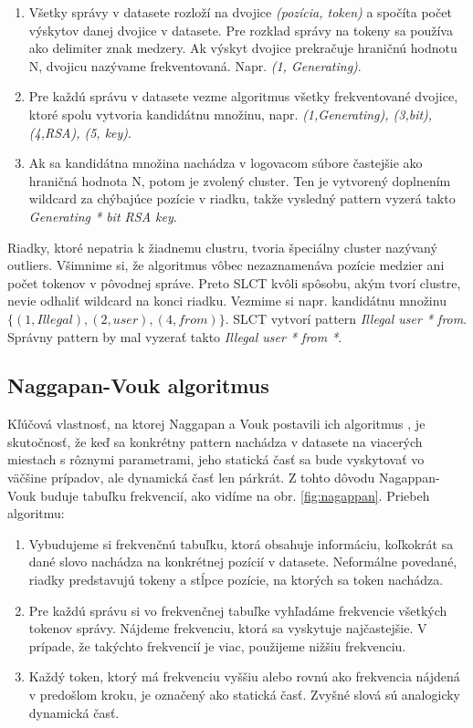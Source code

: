 \begin{enumerate}
  \item Všetky správy v datasete rozloží na dvojice \emph{(pozícia, token)} a spočíta počet výskytov danej dvojice v datasete. Pre rozklad správy na tokeny sa používa ako delimiter znak medzery. Ak výskyt dvojice prekračuje hraničnú hodnotu N, dvojicu nazývame frekventovaná. Napr. \emph{(1, Generating)}.
  \item Pre každú správu v datasete vezme algoritmus všetky frekventované dvojice, ktoré spolu vytvoria kandidátnu množinu, napr. \emph{{(1,Generating), (3,bit), (4,RSA), (5, key)}}. 
  \item Ak sa kandidátna množina nachádza v logovacom súbore častejšie ako hraničná hodnota N, potom je zvolený cluster. Ten je vytvorený doplnením wildcard za chýbajúce pozície v riadku, takže vysledný pattern vyzerá takto \emph{Generating * bit RSA key}.
\end{enumerate}

Riadky, ktoré nepatria k žiadnemu clustru, tvoria špeciálny cluster nazývaný outliers. Všimnime si, že algoritmus vôbec nezaznamenáva pozície medzier ani počet tokenov v pôvodnej správe. Preto SLCT kvôli spôsobu, akým tvorí clustre, nevie odhaliť wildcard na konci riadku. Vezmime si napr. kandidátnu množinu $\{(1,Illegal), (2,user), (4,from)\} $. SLCT vytvorí pattern \emph{Illegal user * from}. Správny pattern by mal vyzerať takto  \emph{Illegal user * from *}.

\subsection{Naggapan-Vouk algoritmus}
Kľúčová vlastnosť, na ktorej Naggapan a Vouk postavili ich algoritmus \parencite{nagappanvouk}, je skutočnosť, že keď sa konkrétny pattern nachádza v datasete na viacerých miestach s rôznymi parametrami, jeho statická časť sa bude vyskytovať vo väčšine prípadov, ale dynamická časť len párkrát. Z tohto dôvodu Nagappan-Vouk buduje tabuľku frekvencií, ako vidíme na obr. \ref{fig:nagappan}. Priebeh algoritmu:

\begin{enumerate}
  \item Vybudujeme si frekvenčnú tabuľku, ktorá obsahuje informáciu, koľkokrát sa dané slovo nachádza na konkrétnej pozícií v datasete. Neformálne povedané, riadky predstavujú tokeny a stĺpce pozície, na ktorých sa token nachádza.
  \item Pre každú správu si vo frekvenčnej tabuľke vyhľadáme frekvencie všetkých tokenov správy. Nájdeme frekvenciu, ktorá sa vyskytuje najčastejšie. V prípade, že takýchto frekvencií je viac, použijeme nižšiu frekvenciu.
  \item Každý token, ktorý má frekvenciu vyššiu alebo rovnú ako frekvencia nájdená v predošlom kroku, je označený ako statická časť. Zvyšné slová sú analogicky dynamická časť.
\end{enumerate}

